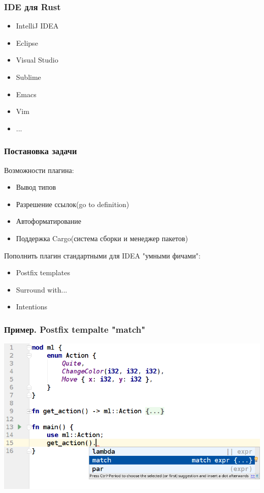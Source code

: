 \documentclass[10pt,pdf,hyperref={unicode}]{beamer}
\begin{document}
\begin{frame}
	\frametitle{IDE для Rust} 
	\begin{itemize}
		\item IntelliJ IDEA
		\item Eclipse
		\item Visual Studio
        \item Sublime
		\item Emacs
		\item Vim
		\item ...
	\end{itemize}
\end{frame}

\begin{frame}
	\frametitle{Постановка задачи} 
	Возможности плагина:
	\begin{itemize}
		\item Вывод типов
		\item Разрешение ссылок(go to definition)
		\item Автоформатирование
        \item Поддержка Cargo(система сборки и менеджер пакетов)
	\end{itemize}
	\vfill
	Пополнить плагин стандартными для IDEA "умными фичами":
	\begin{itemize}
		\item Postfix templates
		\item Surround with...
		\item Intentions
	\end{itemize}
\end{frame}

\begin{frame}
	\frametitle{Пример. Postfix tempalte "match"} 
	\includegraphics[scale = 0.6]{match_before.png}
\end{frame}
\end{document}
